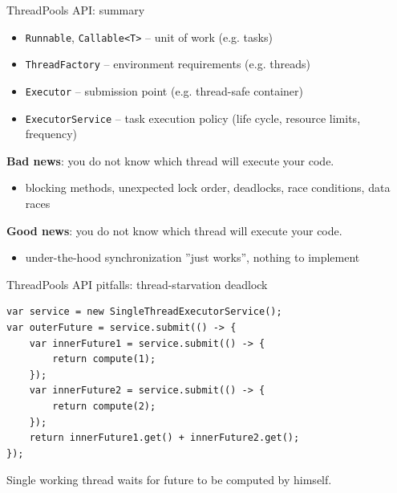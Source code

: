 \begin{frame}[fragile]{ThreadPools API: summary}

\begin{itemize}
    \item \texttt{Runnable}, \texttt{Callable<T>} -- unit of work (e.g. tasks)
    \item \texttt{ThreadFactory} -- environment requirements (e.g. threads)
    \item \texttt{Executor} -- submission point (e.g. thread-safe container)
    \item \texttt{ExecutorService} -- task execution policy (life cycle, resource limits, frequency)
\end{itemize}

\pause

\textbf{Bad news}: you do not know which thread will execute your code.
\begin{itemize}
    \item blocking methods, unexpected lock order, deadlocks, race conditions, data races
\end{itemize}

\pause

\textbf{Good news}: you do not know which thread will execute your code.
\begin{itemize}
    \item under-the-hood synchronization ''just works'', nothing to implement
\end{itemize}
\end{frame}


\begin{frame}[t,fragile]{ThreadPools API pitfalls: thread-starvation deadlock}

\begin{verbatim}
var service = new SingleThreadExecutorService();
var outerFuture = service.submit(() -> {
    var innerFuture1 = service.submit(() -> {
        return compute(1);
    });
    var innerFuture2 = service.submit(() -> {
        return compute(2);
    });
    return innerFuture1.get() + innerFuture2.get();
});
\end{verbatim}

\pause
Single working thread waits for future to be computed by himself.
\end{frame}


